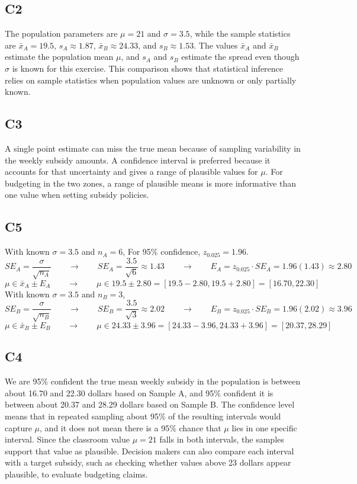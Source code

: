 \begin{ExamProblems}
		\subsection*{C2}
		The population parameters are $\mu = 21$ and $\sigma = 3.5$, while the sample statistics are $\bar{x}_A = 19.5$, $s_A \approx 1.87$, $\bar{x}_B \approx 24.33$, and $s_B \approx 1.53$. The values $\bar{x}_A$ and $\bar{x}_B$ estimate the population mean $\mu$, and $s_A$ and $s_B$ estimate the spread even though $\sigma$ is known for this exercise. This comparison shows that statistical inference relies on sample statistics when population values are unknown or only partially known.

		\subsection*{C3}
		A single point estimate can miss the true mean because of sampling variability in the weekly subsidy amounts. A confidence interval is preferred because it accounts for that uncertainty and gives a range of plausible values for $\mu$. For budgeting in the two zones, a range of plausible means is more informative than one value when setting subsidy policies.

		\subsection*{C5}
		With known $\sigma = 3.5$ and $n_A = 6$, For 95\% confidence, $z_{0.025}=1.96$.
		\[
		SE_A = \frac{\sigma}{\sqrt{n_A}}  \qquad \longrightarrow \qquad SE_A = \frac{3.5}{\sqrt{6}} \approx 1.43  \qquad \longrightarrow \qquad  E_A = z_{0.025} \cdot SE_A = 1.96(1.43) \approx 2.80
		\]
		\[
		\mu \in \bar{x}_A \pm E_A  \qquad \longrightarrow \qquad \mu \in 19.5 \pm 2.80 = [19.5 - 2.80, 19.5 + 2.80] = [16.70, 22.30]
		\]
		With known $\sigma = 3.5$ and $n_B = 3$,
		\[
		SE_B = \frac{\sigma}{\sqrt{n_B}}  \qquad \longrightarrow \qquad SE_B = \frac{3.5}{\sqrt{3}} \approx 2.02  \qquad \longrightarrow \qquad E_B = z_{0.025} \cdot SE_B = 1.96(2.02) \approx 3.96
		\]
		\[
		\mu \in \bar{x}_B \pm E_B   \qquad \longrightarrow \qquad \mu \in 24.33 \pm 3.96 = [24.33 - 3.96, 24.33 + 3.96] = [20.37, 28.29]
		\]

		\subsection*{C4}
		We are 95\% confident the true mean weekly subsidy in the population is between about 16.70 and 22.30 dollars based on Sample A, and 95\% confident it is between about 20.37 and 28.29 dollars based on Sample B. The confidence level means that in repeated sampling about 95\% of the resulting intervals would capture $\mu$, and it does not mean there is a 95\% chance that $\mu$ lies in one specific interval. Since the classroom value $\mu = 21$ falls in both intervals, the samples support that value as plausible. Decision makers can also compare each interval with a target subsidy, such as checking whether values above 23 dollars appear plausible, to evaluate budgeting claims.


\end{ExamProblems}
